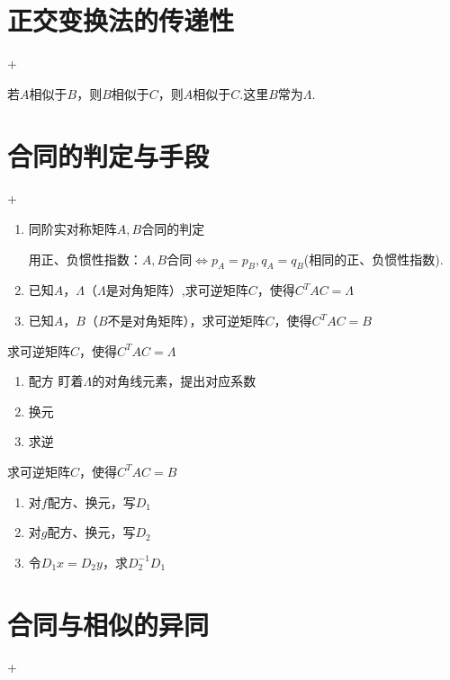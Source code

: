\section{正交变换法的传递性}
\DOne+\DTwoThree

若$A$相似于$B$，则$B$相似于$C$，则$A$相似于$C$.这里$B$常为$\Lambda$.

\section{合同的判定与手段}
\DOne+\DTwoThree

\begin{enumerate}
    \item 同阶实对称矩阵$A,B$合同的判定

          用正、负惯性指数：$A,B$合同$\Leftrightarrow p_A=p_B,q_A=q_B$(相同的正、负惯性指数).
    \item 已知$A$，$\Lambda$（$\Lambda$是对角矩阵）,求可逆矩阵$C$，使得$C^TAC=\Lambda$
    \item 已知$A$，$B$（$B$不是对角矩阵），求可逆矩阵$C$，使得$C^TAC=B$
\end{enumerate}
\begin{idea}{求可逆矩阵$C$，使得$C^TAC=\Lambda$}{}
    \begin{enumerate}
        \item 配方 盯着$\Lambda$的对角线元素，提出对应系数
        \item 换元
        \item 求逆
    \end{enumerate}
\end{idea}
\begin{idea}{求可逆矩阵$C$，使得$C^TAC=B$}{}
    \begin{enumerate}
        \item 对$f$配方、换元，写$D_1$
        \item 对$g$配方、换元，写$D_2$
        \item 令$D_1x=D_2y$，求$D_2^{-1}D_1$
    \end{enumerate}
\end{idea}
\section{合同与相似的异同}
\DOne+\DTwoThree

